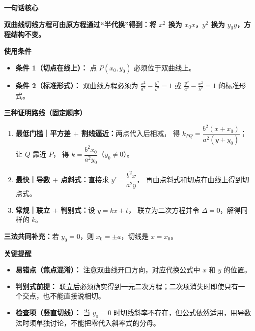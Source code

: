 \clearpage
\begin{summarybox}
	\textbf{\textcolor{CSummary}{一句话核心}}

	\textbf{双曲线切线方程可由原方程通过“半代换”得到：将 $x^{2}$ 换为 $x_{0}x$，$y^{2}$ 换为 $y_{0}y$，方程结构不变。}

	\medskip
	\textbf{\textcolor{CSummary}{使用条件}}
	\begin{itemize}[leftmargin=*, itemsep=0.5em, topsep=0.4em]
		\item \textbf{条件 1（切点在线上）：} 点 $P(x_0,y_0)$ 必须位于双曲线上。
		\item \textbf{条件 2（标准形式）：} 双曲线方程必须为 $\frac{x^{2}}{a^{2}}-\frac{y^{2}}{b^{2}}=1$ 或 $\frac{y^{2}}{a^{2}}-\frac{x^{2}}{b^{2}}=1$ 的标准形式。
	\end{itemize}

	\medskip
    \textbf{\textcolor{CSummary}{三种证明路线（固定顺序）}}
    \begin{enumerate}[leftmargin=*, itemsep=0.4em, topsep=0.3em]
      \item \textbf{最低门槛｜平方差 $+$ 割线逼近：}两点代入后相减，
      得 $k_{PQ}=\dfrac{b^2(x+x_0)}{a^2(y+y_0)}$；让 $Q$ 靠近 $P$，
      得 $k=\dfrac{b^2x_0}{a^2y_0}$（$y_0\ne0$）。
      \item \textbf{最快｜导数 $+$ 点斜式：}直接求 $y'=\dfrac{b^2x}{a^2y}$，
      再由点斜式和切点在曲线上得到切点式。
      \item \textbf{常规｜联立 $+$ 判别式：}设 $y=kx+t$，
      联立为二次方程并令 $\Delta=0$，解得同样的 $k$。
    \end{enumerate}
    \textbf{三法共同补充：}若 $y_0=0$，则 $x_0=\pm a$，切线是 $x=x_0$。

    \medskip
    \textbf{\textcolor{CSummary}{关键提醒}}
	\begin{itemize}[leftmargin=*, itemsep=0.5em, topsep=0.4em]
		\item \textbf{易错点（焦点混淆）：} 注意双曲线开口方向，对应代换公式中 $x$ 和 $y$ 的位置。
		\item \textbf{判别式前提：} 联立后必须确实得到一元二次方程；二次项消失时即使只有一个交点，也不能直接说相切。
		\item \textbf{检查项（竖直切线）：} 当 $y_0=0$ 时切线斜率不存在，但公式依然适用，用导数法时须单独讨论，不能把零代入斜率式的分母。
	\end{itemize}
\end{summarybox}
